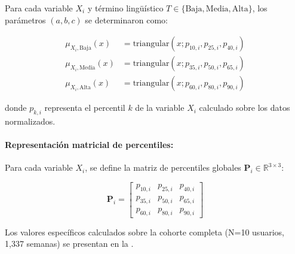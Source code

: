 Para cada variable \(X_i\) y término lingüístico \(T \in \{\text{Baja}, \text{Media}, \text{Alta}\}\), los parámetros \((a, b, c)\) se determinaron como:

\begin{align}
\mu_{X_i, \text{Baja}}(x) &= \text{triangular}(x; p_{10,i}, p_{25,i}, p_{40,i}) \label{eq:mf_baja} \\
\mu_{X_i, \text{Media}}(x) &= \text{triangular}(x; p_{35,i}, p_{50,i}, p_{65,i}) \label{eq:mf_media} \\
\mu_{X_i, \text{Alta}}(x) &= \text{triangular}(x; p_{60,i}, p_{80,i}, p_{90,i}) \label{eq:mf_alta}
\end{align}

donde \(p_{k,i}\) representa el percentil \(k\) de la variable \(X_i\) calculado sobre los datos normalizados.

\paragraph{Representación matricial de percentiles:}

Para cada variable \(X_i\), se define la matriz de percentiles globales \(\mathbf{P}_i \in \mathbb{R}^{3 \times 3}\):

\begin{equation}
\mathbf{P}_i = \begin{bmatrix}
p_{10,i} & p_{25,i} & p_{40,i} \\
p_{35,i} & p_{50,i} & p_{65,i} \\
p_{60,i} & p_{80,i} & p_{90,i}
\end{bmatrix}
\label{eq:matriz_percentiles}
\end{equation}

Los valores específicos calculados sobre la cohorte completa (N=10 usuarios, 1,337 semanas) se presentan en la .

